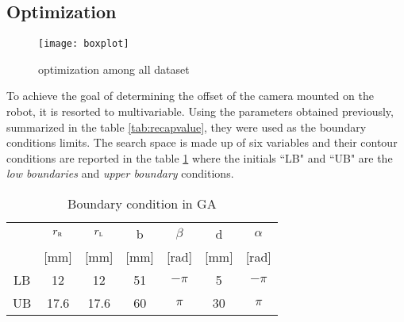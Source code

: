 \subsection{Optimization}
\begin{figure*}[htb]
\centering
\texttt{[image: boxplot]}
\caption{optimization among all dataset}
\label{fig:boxplot}
\end{figure*}
To achieve the goal of determining the offset of the camera mounted on the robot, it is resorted to multivariable.
Using the parameters obtained previously, summarized in the table \ref{tab:recapvalue}, they were used as the boundary conditions limits.
The search space is made up of six variables and their contour conditions are reported in the table \ref{tab:BoundConditionGA} where the initials “LB" and “UB" are the \emph{low boundaries} and \emph{upper boundary} conditions.

\begin{table}[!h]
\centering
\begin{adjustbox}{max width=0.45\textwidth}
\begin{tabular}{ccccccc}
\hline
	&$r_\textsc{r}$ 	& $r_\textsc{l}$	&   b 	& $\beta$	& d 		& $\alpha$\\
	&[mm] 			&    [mm]		& [mm]	&  [rad]		& [mm] 	&  [rad]\\
\hline
LB	&	12  			& 	12  			& 	51 	&	$-\pi$ 	& 	5 	&	$-\pi$\\     
UB 	& 	17.6 		&	17.6 		&	60 	& 	$\pi$ 	&	30	&	$\pi$\\ 
\hline
\end{tabular}
\end{adjustbox}
\caption{Boundary condition in GA}
\label{tab:BoundConditionGA}
\end{table}

